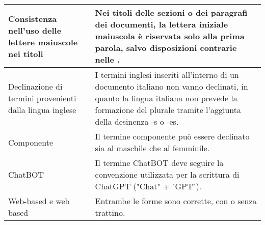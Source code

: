 \begin{adjustwidth}{-0.5cm}{-0.5cm}
\begin{longtable}{|P{4.5cm}|>{\raggedright\arraybackslash}P{9cm}|}
		\hline Consistenza nell'uso delle lettere maiuscole nei titoli & Nei titoli delle sezioni o dei paragrafi dei documenti, la lettera iniziale maiuscola è riservata solo alla prima parola, salvo disposizioni contrarie nelle \NdP. \\
		\hline Declinazione di termini provenienti dalla lingua inglese & I termini inglesi inseriti all'interno di un documento italiano non vanno declinati, in quanto la lingua italiana non prevede la formazione del plurale tramite l'aggiunta della desinenza -s o -es. \\
		\hline Componente & Il termine componente può essere declinato sia al maschile che al femminile. \\
		\hline ChatBOT & Il termine ChatBOT deve seguire la convenzione utilizzata per la scrittura di ChatGPT ("Chat" + "GPT"). \\
		\hline Web-based e web based & Entrambe le forme sono corrette, con o senza trattino. \\
	\end{longtable}
\end{adjustwidth}
\egroup